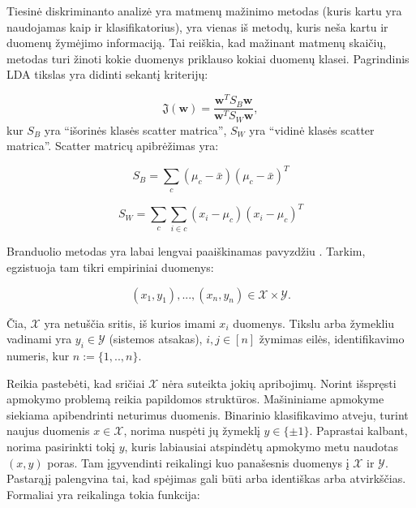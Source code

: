 \documentclass[]{vgtuef}
\begin{document}
Tiesinė diskriminanto analizė \cite{welling2005fisher} yra matmenų mažinimo metodas (kuris kartu yra naudojamas kaip ir klasifikatorius), yra vienas iš metodų, kuris neša kartu ir duomenų žymėjimo informaciją. Tai reiškia, kad mažinant matmenų skaičių, metodas turi žinoti kokie duomenys priklauso kokiai duomenų klasei. Pagrindinis LDA tikslas yra didinti sekantį kriterijų:

\begin{equation}
  \mathfrak{J}(\mathbf{w}) = \frac{ \mathbf{w}^T S_B \mathbf{w} }{
    \mathbf{w}^T S_W \mathbf{w} },
\end{equation}
kur $S_B$ yra ``išorinės klasės scatter matrica'', $S_W$ yra ``vidinė klasės scatter matrica''. Scatter matricų apibrėžimas yra:

\begin{equation}
  S_B = \sum_c (\mu_c - \bar{x})(\mu_c - \bar{x})^T
\end{equation}

\begin{equation}
  S_W = \sum_c \sum_{i \in c} ( x_i - \mu_c)(x_i - \mu_c)^T
\end{equation}


Branduolio metodas yra labai lengvai paaiškinamas pavyzdžiu \cite{2007math......1907H}. Tarkim, egzistuoja tam tikri empiriniai duomenys:

\begin{equation}
  (x_1,y_1),...,(x_n,y_n) \in \mathcal{X} \times \mathcal{Y}.
\end{equation}

Čia, $\mathcal{X}$ yra netuščia sritis, iš kurios imami $x_i$ duomenys. Tikslu arba žymekliu vadinami yra $y_i \in \mathcal{Y}$ (sistemos atsakas), $i,j \in [n]$ žymimas eilės, identifikavimo numeris, kur $n := \{1,..,n\}$.

Reikia pastebėti, kad sričiai $\mathcal{X}$ nėra suteikta jokių apribojimų. Norint išspręsti apmokymo problemą reikia papildomos struktūros. Mašininiame apmokyme siekiama apibendrinti neturimus duomenis. Binarinio klasifikavimo atveju, turint naujus duomenis $x \in \mathcal{X}$, norima nuspėti jų žymeklį $y \in \{\pm 1\}$. Paprastai kalbant, norima pasirinkti tokį $y$, kuris labiausiai atspindėtų apmokymo metu naudotas $(x,y)$ poras. Tam įgyvendinti reikalingi kuo panašesnis duomenys į $\mathcal{X}$ ir $\mathcal{Y}$. Pastarąjį palengvina tai, kad spėjimas gali būti arba identiškas arba atvirkščias. Formaliai yra reikalinga tokia funkcija:
\end{document}
